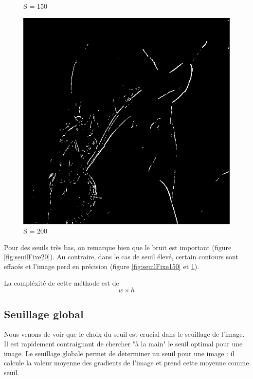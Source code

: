 \documentclass[11pt]{article}
\begin{document}
\begin{figure}[H]
\begin{minipage}[c]{.30\linewidth}
			\caption{S = 150}
			\label{fig:seuilFixe150}
		\end{minipage} \hfill
		\begin{minipage}[c]{.30\linewidth}
			\centering
			\includegraphics[scale=0.15]{Image/seuilFixe200.png}
			\caption{S = 200}
			\label{fig:seuilFixe200}
		\end{minipage}
	\end{figure}

	Pour des seuils très bas, on  remarque bien que le bruit est important (figure \ref{fig:seuilFixe20}).
	Au contraire, dans le cas de seuil élevé, certain contours sont effacés et l'image perd en précision (figure \ref{fig:seuilFixe150} et \ref{fig:seuilFixe200}).

	La compléxité de cette méthode est de \[w \times h\]

	\subsection{Seuillage global}

	Nous venons de voir que le choix du seuil est crucial dans le seuillage de l'image. 
	Il est rapidement contraignant de chercher "à la main" le seuil optimal pour une image.
	Le seuillage globale permet de determiner un seuil pour une image : il calcule la valeur moyenne des gradients de l'image et 
	prend cette moyenne comme seuil.
\end{document}

